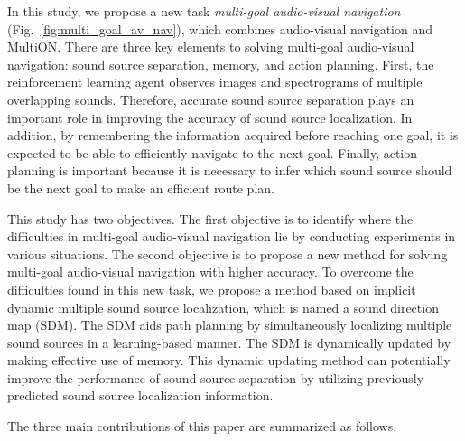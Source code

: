 In this study, we propose a new task \textit{multi-goal audio-visual navigation} (Fig.~\ref{fig:multi_goal_av_nav}), which combines audio-visual navigation and MultiON.
There are three key elements to solving multi-goal audio-visual navigation:
sound source separation, memory, and action planning.
First, the reinforcement learning agent observes images and spectrograms of multiple overlapping sounds.
Therefore, accurate sound source separation plays an important role in improving the accuracy of sound source localization.
In addition, by remembering the information acquired before reaching one goal, it is expected to be able to efficiently navigate to the next goal.
Finally, action planning is important because it is necessary to infer which sound source should be the next goal to make an efficient route plan.

This study has two objectives.
The first objective is to identify where the difficulties in multi-goal audio-visual navigation lie by conducting experiments in various situations.
The second objective is to propose a new method for solving multi-goal audio-visual navigation with higher accuracy.
To overcome the difficulties found in this new task, we propose a method based on implicit dynamic multiple sound source localization, which is named a sound direction map (SDM).
The SDM aids path planning by simultaneously localizing multiple sound sources in a learning-based manner.
The SDM is dynamically updated by making effective use of memory.
This dynamic updating method can potentially improve the performance of sound source separation by utilizing previously predicted sound source localization information.

The three main contributions of this paper are summarized as follows.

